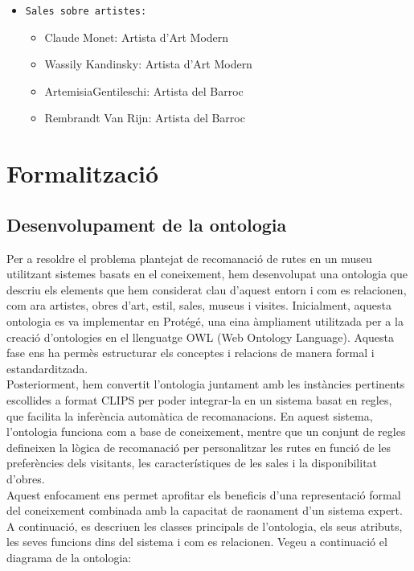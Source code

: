 \documentclass[a4paper]{article}
\begin{document}
	\begin{itemize}
		\item \texttt{Sales sobre artistes: } 
		\begin{itemize}
			\item Claude Monet: Artista d'Art Modern
			\item Wassily Kandinsky: Artista d'Art Modern
			\item ArtemisiaGentileschi: Artista del Barroc
			\item Rembrandt Van Rijn: Artista del Barroc
		\end{itemize}
	\end{itemize}
	
	\newpage
	\section{Formalització}
	
	\subsection{Desenvolupament de la ontologia}
	
	Per a resoldre el problema plantejat de recomanació de rutes en un museu utilitzant sistemes basats en el coneixement, hem desenvolupat una ontologia que descriu els elements que hem considerat clau d’aquest entorn i com es relacionen, com ara artistes, obres d’art, estil, sales, museus i visites. Inicialment, aquesta ontologia es va implementar en Protégé, una eina àmpliament utilitzada per a la creació d’ontologies en el llenguatge OWL (Web Ontology Language). Aquesta fase ens ha permès estructurar els conceptes i relacions de manera formal i estandarditzada. \\
	
	Posteriorment, hem convertit l’ontologia juntament amb les instàncies pertinents escollides a format CLIPS per poder integrar-la en un sistema basat en regles, que facilita la inferència automàtica de recomanacions. En aquest sistema, l’ontologia funciona com a base de coneixement, mentre que un conjunt de regles defineixen la lògica de recomanació per personalitzar les rutes en funció de les preferències dels visitants, les característiques de les sales i la disponibilitat d’obres. \\
	
	Aquest enfocament ens permet aprofitar els beneficis d’una representació formal del coneixement combinada amb la capacitat de raonament d’un sistema expert. A continuació, es descriuen les classes principals de l’ontologia, els seus atributs, les seves funcions dins del sistema i com es relacionen. Vegeu a continuació el diagrama de la ontologia: \\
	
\end{document}
